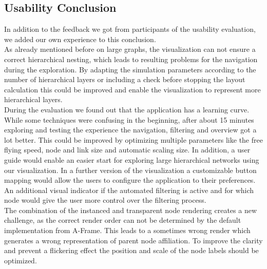 \subsection{Usability Conclusion}
In addition to the feedback we got from participants of the usability evaluation, we added our own experience to this conclusion.
\\
As already mentioned before on large graphs, the visualization can not ensure a correct hierarchical nesting, which leads to resulting problems for the navigation during the exploration. 
By adapting the simulation parameters according to the number of hierarchical layers or including a check before stopping the layout calculation this could be improved and enable the visualization to represent more hierarchical layers.
\\
During the evaluation we found out that the application has a learning curve. 
While some techniques were confusing in the beginning, after about 15 minutes exploring and testing the experience the navigation, filtering and overview got a lot better.
This could be improved by optimizing multiple parameters like the free flying speed, node and link size and automatic scaling size. 
In addition, a user guide would enable an easier start for exploring large hierarchical networks using our visualization.
In a further version of the visualization a customizable button mapping would allow the users to configure the application to their preferences.
An additional visual indicator if the automated filtering is active and for which node would give the user more control over the filtering process.
\\
The combination of the instanced and transparent node rendering creates a new challenge, as the correct render order can not be determined by the default implementation from A-Frame. This leads to a sometimes wrong render which generates a wrong representation of parent node affiliation.
To improve the clarity and prevent a flickering effect the position and scale of the node labels should be optimized.
